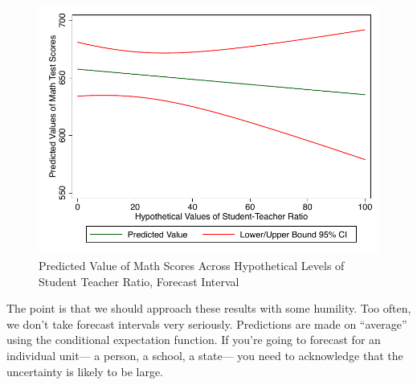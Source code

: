 \documentclass[12pt]{article}
\begin{document}
\begin{figure}
  \centering
  \caption{Predicted Value of Math Scores Across Hypothetical Levels
    of Student Teacher Ratio, Forecast Interval}
\includegraphics{ci_predict95_forecast}
\end{figure}

The point is that we should approach these results with some
humility. Too often, we don't take forecast intervals very
seriously. Predictions are made on ``average'' using the conditional
expectation function. If you're going to forecast for an individual
unit--- a person, a school, a state--- you need to acknowledge that
the uncertainty is likely to be large. 
\end{document}
